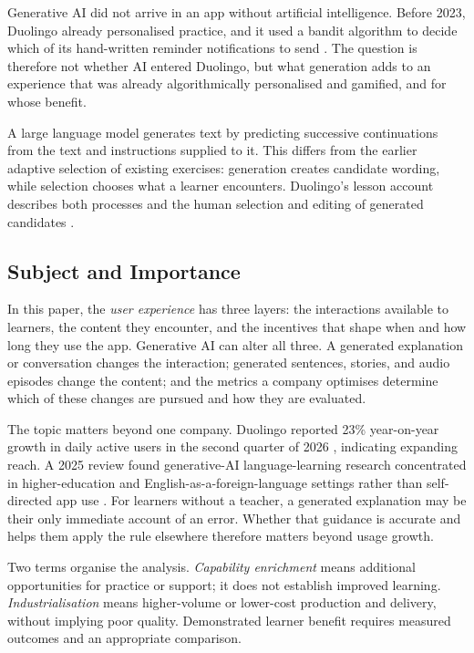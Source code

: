 \documentclass[11pt,titlepage]{article}
\begin{document}
Generative AI did not arrive in an app without artificial intelligence. Before 2023, Duolingo already personalised practice, and it used a bandit algorithm to decide which of its hand-written reminder notifications to send \parencite{freeman2023,yancey2020}. The question is therefore not whether AI entered Duolingo, but what generation adds to an experience that was already algorithmically personalised and gamified, and for whose benefit.

A large language model generates text by predicting successive continuations from the text and instructions supplied to it. This differs from the earlier adaptive selection of existing exercises: generation creates candidate wording, while selection chooses what a learner encounters. Duolingo's lesson account describes both processes and the human selection and editing of generated candidates \parencite{contentProduction}.

\subsection{Subject and Importance}
In this paper, the \emph{user experience} has three layers: the interactions available to learners, the content they encounter, and the incentives that shape when and how long they use the app. Generative AI can alter all three. A generated explanation or conversation changes the interaction; generated sentences, stories, and audio episodes change the content; and the metrics a company optimises determine which of these changes are pursued and how they are evaluated.

The topic matters beyond one company. Duolingo reported 23\% year-on-year growth in daily active users in the second quarter of 2026 \parencite[p.~3]{shareholder2026}, indicating expanding reach. A 2025 review found generative-AI language-learning research concentrated in higher-education and English-as-a-foreign-language settings rather than self-directed app use \parencite{liReview2025}. For learners without a teacher, a generated explanation may be their only immediate account of an error. Whether that guidance is accurate and helps them apply the rule elsewhere therefore matters beyond usage growth.

Two terms organise the analysis. \emph{Capability enrichment} means additional opportunities for practice or support; it does not establish improved learning. \emph{Industrialisation} means higher-volume or lower-cost production and delivery, without implying poor quality. Demonstrated learner benefit requires measured outcomes and an appropriate comparison.
\end{document}
